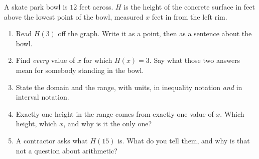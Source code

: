 \documentclass[10pt]{article}
\begin{document}
\boxguard[30]
\begin{tcolorbox}[colback=white, colframe=black!40,
    title=\textbf{Tier A --- Approaching Proficiency},
    fonttitle=\bfseries, arc=2mm, left=3mm, right=3mm, top=2mm, bottom=2mm, breakable]
\small
A skate park bowl is $12$ feet across. $H$ is the height of the concrete surface in feet above the
lowest point of the bowl, measured $x$ feet in from the left rim.

\begin{center}
\end{center}

\begin{enumerate}[leftmargin=1.6em, itemsep=4pt, topsep=2pt]
  \item Read $H(3)$ off the graph. Write it as a point, then as a sentence about the bowl.


  \item Find \emph{every} value of $x$ for which $H(x)=3$. Say what those two answers mean for
        somebody standing in the bowl.


  \item State the domain and the range, with units, in inequality notation \emph{and} in interval
        notation.


  \item Exactly one height in the range comes from exactly one value of $x$. Which height, which
        $x$, and why is it the only one?


  \item A contractor asks what $H(15)$ is. What do you tell them, and why is that not a question
        about arithmetic?

\end{enumerate}
\end{tcolorbox}
\end{document}
